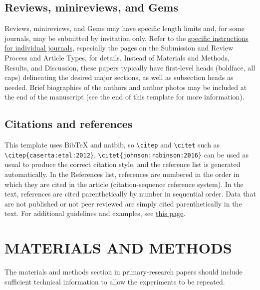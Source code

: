 \documentclass{asmarticle}
\begin{document}
\subsection{Reviews, minireviews, and Gems}
	Reviews, minireviews, and Gems may have specific length limits and, for some journals, may be submitted by invitation only. Refer to the \href{https://journals.asm.org/links-to-journal-author-instructions}{\underline{specific instructions for individual journals}}, especially the pages on the Submission and Review Process and Article Types, for details. Instead of Materials and Methods, Results, and Discussion, these papers typically have first-level heads (boldface, all caps) delineating the desired major sections, as well as subsection heads as needed. Brief biographies of the authors and author photos may be included at the end of the manuscript (see the end of this template for more information). 

\subsection{Citations and references}
	This template uses BibTeX and natbib, so \verb|\citep| and \verb|\citet| such as \verb|\citep{caserta:etal:2012}|, \verb|\citet{johnson:robinson:2016}| can be used as usual to produce the correct citation style, and the reference list is generated automatically. In the References list, references are numbered in the order in which they are cited in the article (citation-sequence reference system). In the text, references are cited parenthetically by number in sequential order. Data that are not published or not peer reviewed are simply cited parenthetically in the text. For additional guidelines and examples, see \href{https://journals.asm.org/references}{\underline{this page}}. 

\section{MATERIALS AND METHODS}
	The materials and methods section in primary-research papers should include sufficient technical information to allow the experiments to be repeated. 
\end{document}
